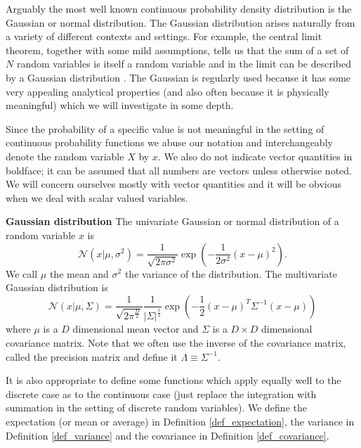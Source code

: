 Arguably the most well known continuous probability density distribution is the Gaussian or normal distribution. The Gaussian distribution arises naturally from a variety of different contexts and settings. For example, the central limit theorem, together with some mild assumptions, tells us that the sum of a set of $N$ random  variables is itself a random variable and in the limit can be described by a Gaussian distribution \cite{bishop}. The Gaussian is regularly used because it has some very appealing analytical properties (and also often because it is physically meaningful) which we will investigate in some depth. 

Since the probability of a specific value is not meaningful in the setting of continuous probability functions we abuse our notation and interchangeably denote the random variable $X$ by $x$. We also do not indicate vector quantities in boldface; it can be assumed that all numbers are vectors unless otherwise noted. We will concern ourselves mostly with vector quantities and it will be obvious when we deal with scalar valued variables. 
\begin{defn}
\textbf{Gaussian distribution} The univariate Gaussian or normal distribution of a random variable $x$ is
\begin{equation}
\mathcal{N}(x|\mu, \sigma^2) = \frac{1}{\sqrt{2\pi\sigma^2}}\exp\left(-\frac{1}{2\sigma^2}(x-\mu)^2\right).
\label{eq_norm_uni}
\end{equation}
We call $\mu$ the mean and $\sigma^2$ the variance of the distribution. The multivariate Gaussian distribution is 
\begin{equation}
\mathcal{N}(x|\mu, \Sigma) = \frac{1}{\sqrt{2\pi^{\frac{D}{2}}}}\frac{1}{|\Sigma|^{\frac{1}{2}}}\exp\left(-\frac{1}{2}(x-\mu)^T\Sigma^{-1}(x-\mu)\right)
\label{eq_norm_multi}
\end{equation}
where $\mu$ is a $D$ dimensional mean vector and $\Sigma$ is a $D \times D$ dimensional covariance matrix. Note that we often use the inverse of the covariance matrix, called the precision matrix and define it $\Lambda \equiv \Sigma^{-1}$.
\label{defn_gauss}
\end{defn}
It is also appropriate to define some functions which apply equally well to the discrete case as to the continuous case (just replace the integration with summation in the setting of discrete random variables). We define the expectation (or mean or average) in Definition \ref{def_expectation}, the variance in Definition \ref{def_variance} and the covariance in Definition \ref{def_covariance}. 

